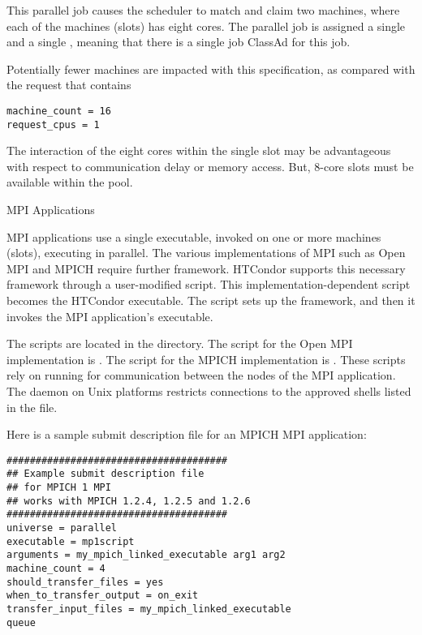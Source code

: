 This parallel job causes the scheduler to match and claim two
machines, where each of the machines (slots) has eight cores.
The parallel job is assigned a single 
and a single , meaning that there is a single job
ClassAd for this job.

Potentially fewer machines are impacted with this specification,
as compared with the request that contains
\footnotesize
\begin{verbatim}
machine_count = 16
request_cpus = 1
\end{verbatim}
\normalsize
The interaction of the eight cores within the single slot may 
be advantageous with respect to communication delay or memory access.
But, 8-core slots must be available within the pool.

\label{sec:parallel-mpi-submit}
\begin{description}
\item[MPI Applications]
\end{description}


MPI applications use a single executable, 
invoked on one or more machines (slots), executing in parallel. 
The various implementations of MPI
such as Open MPI and MPICH require further framework.
HTCondor supports this necessary framework through 
a user-modified script.
This implementation-dependent script becomes the HTCondor executable.
The script sets up the framework,
and then it invokes the MPI application's executable.

The scripts are located in the
 directory.
The script for the Open MPI implementation is .
The script for the MPICH implementation is .
These scripts rely on running  
for communication between the nodes of the MPI application.
The  daemon on Unix platforms restricts
connections to the approved shells listed in the  file.

Here is a sample submit description file for an MPICH MPI application:

\begin{verbatim}
######################################
## Example submit description file
## for MPICH 1 MPI
## works with MPICH 1.2.4, 1.2.5 and 1.2.6
######################################
universe = parallel
executable = mp1script
arguments = my_mpich_linked_executable arg1 arg2
machine_count = 4
should_transfer_files = yes
when_to_transfer_output = on_exit
transfer_input_files = my_mpich_linked_executable
queue
\end{verbatim}

